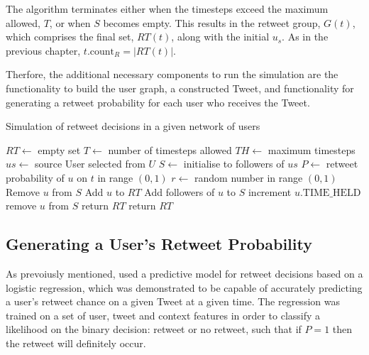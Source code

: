 The algorithm terminates either when the timesteps exceed the maximum allowed, $T$, or when $S$ becomes empty. This results in the retweet group, $G(t)$, which comprises the final set, $RT(t)$, along with the initial $u_s$. As in the previous chapter, $t.\textrm{count}_R = |RT(t)|$.

Therfore, the additional necessary components to run the simulation are the functionality to build the user graph, a constructed Tweet, and functionality for generating a retweet probability for each user who receives the Tweet.

\begin{algorithm}
\caption{Simulation of retweet decisions in a given network of users}
\begin{algorithmic}[1]
    \State $RT\gets$ empty set 
    \State $T\gets$ number of timesteps allowed
    \State $TH\gets$ maximum timesteps 
    \State $us\gets$ source User selected from $U$
    \State $S\gets$ initialise to followers of $us$
    \Statex %
            \State $P\gets$ retweet probability of $u$ on $t$ in range $(0,1)$
            \State $r\gets$ random number in range $(0,1)$
                \State Remove $u$ from $S$
                \State Add $u$ to $RT$
                \State Add followers of $u$ to $S$
            \Else
                \State increment $u.\textrm{TIME\_HELD}$
                    \State remove $u$ from $S$ 
                \EndIf
            \EndIf
        \EndFor
            \State return $RT$ 
        \EndIf
    \EndFor
    \State return $RT$
\EndProcedure
\end{algorithmic}
\label{algo1}
\end{algorithm}


\subsection{Generating a User's Retweet Probability} 
As prevoiusly mentioned, \cite{zhu11} used a predictive model for retweet decisions based on a logistic regression, which was demonstrated to be capable of accurately predicting a user's retweet chance on a given Tweet at a given time. The regression was trained on a set of user, tweet and context features in order to classify a likelihood on the binary decision: retweet or no retweet, such that if $P = 1$ then the retweet will definitely occur.


